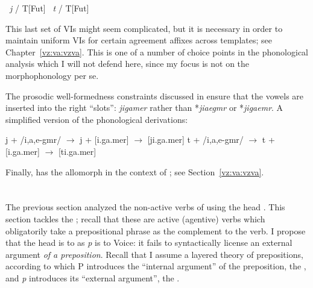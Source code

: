 \begin{exe}
\begin{xlist}
\begin{xlist}
\begin{exe}
\begin{xlist}
\begin{xlist}
\begin{exe}
\begin{xlist}
\begin{xlist}
\begin{exe}
\begin{exe}
\begin{xlist}
\begin{exe}
\begin{exe}
\begin{xlist}
\begin{exe}
\begin{exe}
\begin{exe}
\begin{exe}
\begin{exe}
\begin{xlist}
\begin{exe}
\begin{xlist}
\begin{exe}
\begin{exe}
\begin{xlist}
\begin{exe}
\begin{xlist}
\begin{exe}
\begin{exe}
\begin{exe}
\begin{xlist}
\begin{exe}
\begin{exe}
\begin{exe}
\begin{xlist}
\begin{exe}
\begin{xlist}
\begin{exe}
\begin{xlist}
\begin{exe}
\begin{xlist}
\begin{exe}
\begin{exe}
\begin{exe}
\begin{exe}
 \ex  
 \begin{xlist} 
 	 \lra~\emph{j} / {\trace} T[Fut] 
 	 \lra~\emph{t} / {\trace} T[Fut] 
 \z
\z 

This last set of VIs might seem complicated, but it is necessary in order to maintain uniform VIs for certain agreement affixes across templates; see Chapter~\ref{vz:va:vzva}. This is one of a number of choice points in the phonological analysis which I will not defend here, since my focus is not on the morphophonology per se.

The prosodic well-formedness constraints discussed in \cite{kastner18nllt} ensure that the vowels are inserted into the right ``slots'': \emph{jigamer} rather than *\emph{jiaegmr} or *\emph{jigaemr}. A simplified version of the phonological derivations:
 \begin{exe}
 \ex  
 \begin{xlist} 
 	\ex  j + /i,a,e-gmr/ $\rightarrow$ j + [i.ga.mer] $\rightarrow$ [ji.ga.mer] 
 	\ex  t + /i,a,e-gmr/ $\rightarrow$ t + [i.ga.mer] $\rightarrow$ [ti.ga.mer] 
 \z
\z 

Finally, {\vz} has the allomorph {\thit} in the context of {\va}; see Section~\ref{vz:va:vzva}.


\section{\pz} \label{vz:pz}
The previous section analyzed the non-active verbs of {\tnif} using the head {\vz}. This section tackles the ; recall that these are active (agentive) verbs which obligatorily take a prepositional phrase as the complement to the verb. I propose that the head {\pz} is to {\vz} as \textit{p} is to Voice: it fails to syntactically license an external argument \emph{of a preposition}. Recall that I assume a layered theory of prepositions, according to which P introduces the ``internal argument'' of the preposition, the , and \textit{p} introduces its ``external argument'', the .


\end{xlist}
\end{exe}
\end{xlist}
\end{exe}
\end{exe}
\end{exe}
\end{exe}
\end{xlist}
\end{exe}
\end{xlist}
\end{exe}
\end{xlist}
\end{exe}
\end{xlist}
\end{exe}
\end{exe}
\end{exe}
\end{xlist}
\end{exe}
\end{exe}
\end{exe}
\end{xlist}
\end{exe}
\end{xlist}
\end{exe}
\end{exe}
\end{xlist}
\end{exe}
\end{xlist}
\end{exe}
\end{exe}
\end{exe}
\end{exe}
\end{exe}
\end{xlist}
\end{exe}
\end{exe}
\end{xlist}
\end{exe}
\end{exe}
\end{xlist}
\end{xlist}
\end{exe}
\end{xlist}
\end{xlist}
\end{exe}
\end{xlist}
\end{xlist}
\end{exe}
